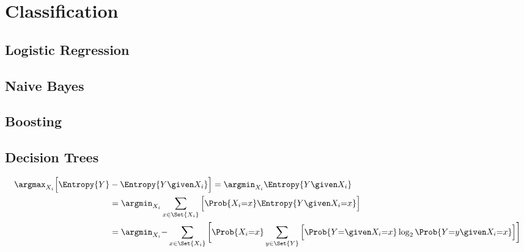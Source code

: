 \documentclass[18pt,a3paper,landscape, ncols=3]{cheatsheet}
\begin{document}
\section{Classification} \seperator
	\subsection{Logistic Regression}
		\begin{mdframed}
			\vspace{10mm}
		\end{mdframed}
		\begin{mdframed}
			\vspace{20mm}
		\end{mdframed}
	\subsection{Naive Bayes}
		\begin{mdframed}
			\vspace{10mm}
		\end{mdframed}
		\begin{mdframed}
			\vspace{20mm}
		\end{mdframed}

\vfill\null
\columnbreak

	\subsection{Boosting}
		\begin{mdframed}
			\vspace{10mm}
		\end{mdframed}
		\begin{mdframed}
			\vspace{20mm}
		\end{mdframed}
	\subsection{Decision Trees}
		\begin{mdframed}
			\begin{align*}
		    \argmax_{X_i} \Big\lbrack \Entropy{Y} &- \Entropy{Y \given X_i} \Big\rbrack = \argmin_{X_i} \Entropy{Y \given X_i} \\
		      &= \argmin_{X_i} \sum_{x \in \Set{X_i}} \Big\lbrack \Prob{X_i{=}x} \Entropy{Y \given X_i{=}x} \Big\rbrack \\
		      &= \argmin_{X_i} {-} \sum_{x \in \Set{X_i}} \bigg\lbrack \Prob{X_i{=}x} \sum_{y \in \Set{Y}} \Big\lbrack \Prob{Y{=} \given X_i{=}x} \log_2 \Prob{Y{=}y \given X_i{=}x} \Big\rbrack \bigg\rbrack
		  \end{align*}
		\end{mdframed}
		\begin{mdframed}
			\vspace{20mm}
		\end{mdframed}
\end{document}
